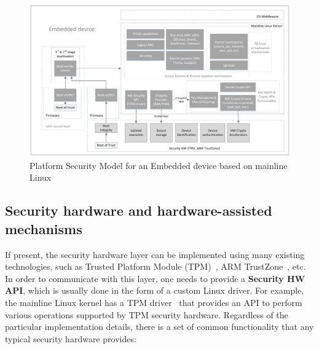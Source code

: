\begin{figure}
	\centering
		\includegraphics[width=1\textwidth]{figures/LinuxKernelPlatSecModel.png}
	\caption{Platform Security Model for an Embedded device based on mainline Linux}
	\label{fig:platsec}
\end{figure}

\subsection{Security hardware and hardware-assisted mechanisms}

If present, the security hardware layer can be implemented using many existing technologies, such as Trusted Platform Module (TPM)~\cite{tpm}, ARM TrustZone~\cite{trustzone}, etc. In order to communicate with this layer, one needs to provide a \textbf{Security HW API}, which is usually done in the form of a custom Linux driver. For example, the mainline Linux kernel has a TPM driver~\cite{tpmdriver} that provides an API to perform various operations supported by TPM security hardware. Regardless of the particular implementation details, there is a set of common functionality that any typical security hardware provides:

